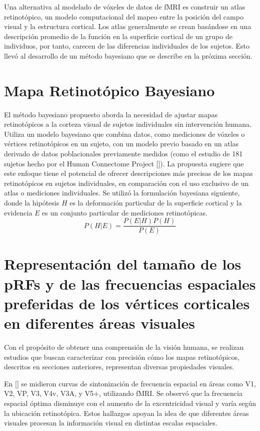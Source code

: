 Una alternativa al modelado de vóxeles de datos de fMRI es construir un atlas retinotópico, un modelo computacional del mapeo entre la posición del campo visual y la estructura cortical. Los atlas generalmente se crean basándose en una descripción promedio de la función en la superficie cortical de un grupo de individuos, por tanto, carecen de las diferencias individuales de los sujetos. Esto llevó al desarrollo de un m\'etodo bayesiano que se describe en la próxima sección.


\section{Mapa Retinotópico Bayesiano}

El método bayesiano propuesto aborda la necesidad de ajustar mapas retinotópicos a la corteza visual de sujetos individuales sin intervención humana. Utiliza un modelo bayesiano que combina datos, como mediciones de v\'oxeles o vértices retinotópicos en un sujeto, con un modelo previo basado en un atlas derivado de datos poblacionales previamente medidos (como el estudio de 181 sujetos hecho por el Human Connectome Project [\cite{benson_human_2018}]). La propuesta sugiere que este enfoque tiene el potencial de ofrecer descripciones más precisas de los mapas retinotópicos en sujetos individuales, en comparación con el uso exclusivo de un atlas o mediciones individuales. Se utiliz\'o la formulaci\'on bayesiana siguiente, donde la hipótesis $H$ es la deformación particular de la superficie cortical y la evidencia $E$ es un conjunto particular de mediciones retinotópicas.
\begin{equation}
	P(H|E) = \dfrac{P(E|H)P(H)}{P(E)}
\end{equation}


\section{Representaci\'on del tama\~no de los pRFs y de las frecuencias espaciales preferidas de los v\'ertices corticales en diferentes \'areas visuales}

Con el propósito de obtener una comprensión de la visión humana, se realizan estudios que buscan caracterizar con precisión cómo los mapas retinotópicos, descritos en secciones anteriores, representan diversas propiedades visuales.

En [\cite{henriksson_spatial_2008}] se midieron curvas de sintonización de frecuencia espacial en áreas como V1, V2, VP, V3, V4v, V3A, y V5+, utilizando fMRI. Se observó que la frecuencia espacial óptima disminuye con el aumento de la excentricidad visual y varía según la ubicación retinotópica. Estos hallazgos apoyan la idea de que diferentes áreas visuales procesan la información visual en distintas escalas espaciales.

